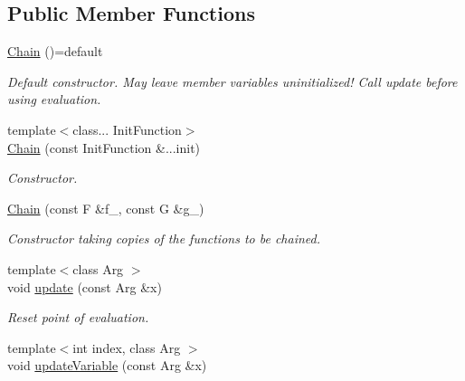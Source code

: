\subsection*{Public Member Functions}
\begin{DoxyCompactItemize}
\item 
\hypertarget{structRFFGen_1_1MathematicalOperations_1_1Chain_aebcae20e7b869fcaa9ec1039b3de8fd5}{\hyperlink{structRFFGen_1_1MathematicalOperations_1_1Chain_aebcae20e7b869fcaa9ec1039b3de8fd5}{Chain} ()=default}\label{structRFFGen_1_1MathematicalOperations_1_1Chain_aebcae20e7b869fcaa9ec1039b3de8fd5}

\begin{DoxyCompactList}\small\item\em Default constructor. May leave member variables uninitialized! Call update before using evaluation. \end{DoxyCompactList}\item 
{\footnotesize template$<$class... Init\-Function$>$ }\\\hyperlink{structRFFGen_1_1MathematicalOperations_1_1Chain_a9d891fe5b5e9bfc7af6c87d2b6dd0731}{Chain} (const Init\-Function \&...init)
\begin{DoxyCompactList}\small\item\em Constructor. \end{DoxyCompactList}\item 
\hyperlink{structRFFGen_1_1MathematicalOperations_1_1Chain_a313e8d55e65802fdcbbd03619dbe3bf2}{Chain} (const F \&f\-\_\-, const G \&g\-\_\-)
\begin{DoxyCompactList}\small\item\em Constructor taking copies of the functions to be chained. \end{DoxyCompactList}\item 
\hypertarget{structRFFGen_1_1MathematicalOperations_1_1Chain_aa2e25c8560d0383e0b07a1886fc92077}{{\footnotesize template$<$class Arg $>$ }\\void \hyperlink{structRFFGen_1_1MathematicalOperations_1_1Chain_aa2e25c8560d0383e0b07a1886fc92077}{update} (const Arg \&x)}\label{structRFFGen_1_1MathematicalOperations_1_1Chain_aa2e25c8560d0383e0b07a1886fc92077}

\begin{DoxyCompactList}\small\item\em Reset point of evaluation. \end{DoxyCompactList}\item 
\hypertarget{structRFFGen_1_1MathematicalOperations_1_1Chain_a6b9577d631eb244c76d7b3d3f3d993d7}{{\footnotesize template$<$int index, class Arg $>$ }\\void \hyperlink{structRFFGen_1_1MathematicalOperations_1_1Chain_a6b9577d631eb244c76d7b3d3f3d993d7}{update\-Variable} (const Arg \&x)}\label{structRFFGen_1_1MathematicalOperations_1_1Chain_a6b9577d631eb244c76d7b3d3f3d993d7}


\end{DoxyCompactItemize}
